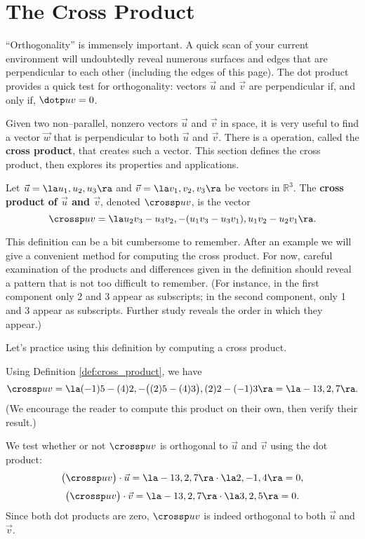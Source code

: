 \section{The Cross Product}\label{sec:cross_product}

``Orthogonality'' is immensely important. A quick scan of your current environment will undoubtedly reveal numerous surfaces and edges that are perpendicular to each other (including the edges of this page). The dot product provides a quick test for orthogonality:  vectors $\vec u$ and $\vec v$ are perpendicular if, and only if, $\dotp uv=0$. 

Given two non--parallel, nonzero vectors $\vec u$ and $\vec v$ in space, it is very useful to find a vector $\vec w$ that is perpendicular to both $\vec u$ and $\vec v$. There is a operation, called the \textbf{cross product}, that creates such a vector. This section defines the cross product, then explores its properties and applications.

{Let $\vec u =\la u_1,u_2,u_3\ra$ and $\vec v = \la v_1,v_2,v_3\ra$ be vectors in $\mathbb{R}^3$. The \textbf{cross product of $\vec u$ and $\vec v$}, denoted $\crossp uv$, is the vector
$$\crossp uv = \la u_2v_3-u_3v_2,-(u_1v_3-u_3v_1),u_1v_2-u_2v_1\ra.$$
}

This definition can be a bit cumbersome to remember. After an example we will give a convenient method for computing the cross product. For now, careful examination of the products and differences given in the definition should reveal a pattern that is not too difficult to remember. (For instance, in the first component only 2 and 3 appear as subscripts; in the second component, only 1 and 3 appear as subscripts. Further study reveals the order in which they appear.)

Let's practice using this definition by computing a cross product.\\

{Using Definition \ref{def:cross_product}, we have
$$\crossp uv = \la (-1)5-(4)2,-\big((2)5-(4)3\big), (2)2-(-1)3\ra = \la -13,2,7\ra.$$ 
(We encourage the reader to compute this product on their own, then verify their result.)

We test whether or not $\crossp uv$ is orthogonal to $\vec u$ and $\vec v$ using the dot product:
$$\big(\crossp uv\big) \cdot \vec u = \la -13,2,7\ra \cdot \la 2,-1,4\ra = 0,$$
$$\big(\crossp uv\big) \cdot \vec v = \la -13,2,7\ra \cdot \la 3,2,5 \ra = 0.$$
Since both dot products are zero, $\crossp uv$ is indeed orthogonal to both $\vec u$ and $\vec v$.
}\\

